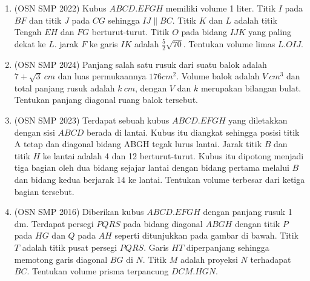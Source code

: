 \documentclass[12pt]{article}
\begin{document}
\begin{CJK*}{UTF8}{min}
\begin{enumerate}
\begin{center}
    \end{center}

    \item (OSN SMP 2022) Kubus $ABCD.EFGH$ memiliki volume 1 liter. Titik $I$ pada $BF$ dan titik $J$ pada $CG$ sehingga $IJ \parallel BC$. Titik $K$ dan $L$ adalah titik Tengah $EH$ dan $FG$ berturut-turut. Titik $O$ pada bidang $IJK$ yang paling dekat ke $L$. jarak $F$ ke garis $IK$ adalah $\frac{5}{2}\sqrt{70}$. Tentukan volume limas $L.OIJ$.

    \item (OSN SMP 2024) Panjang salah satu rusuk dari suatu balok adalah $7 + \sqrt{3}~cm$ dan luas permukaannya $176 cm^2$. Volume balok adalah $V~cm^3$ dan total panjang rusuk adalah $k~cm$, dengan $V$ dan $k$ merupakan bilangan bulat. Tentukan panjang diagonal ruang balok tersebut.

    \item (OSN SMP 2023) Terdapat sebuah kubus $ABCD.EFGH$ yang diletakkan dengan sisi $ABCD$ berada di lantai. Kubus itu diangkat sehingga posisi titik A tetap dan diagonal bidang ABGH tegak lurus lantai. Jarak titik $B$ dan titik $H$ ke lantai adalah 4 dan 12 berturut-turut. Kubus itu dipotong menjadi tiga bagian oleh dua bidang sejajar lantai dengan bidang pertama melalui $B$ dan bidang kedua berjarak 14 ke lantai. Tentukan volume terbesar dari ketiga bagian tersebut.

    \item (OSN SMP 2016) Diberikan kubus $ABCD.EFGH$ dengan panjang rusuk 1 dm. Terdapat persegi $PQRS$ pada bidang diagonal $ABGH$ dengan titik $P$ pada $HG$ dan $Q$ pada $AH$ seperti ditunjukkan pada gambar di bawah. Titik $T$ adalah titik pusat persegi $PQRS$. Garis $HT$ diperpanjang sehingga memotong garis diagonal $BG$ di $N$. Titik $M$ adalah proyeksi $N$ terhadapat $BC$. Tentukan volume prisma terpancung $DCM.HGN$.
    \begin{center}
\end{center}
\end{enumerate}
\end{CJK*}
\end{document}
